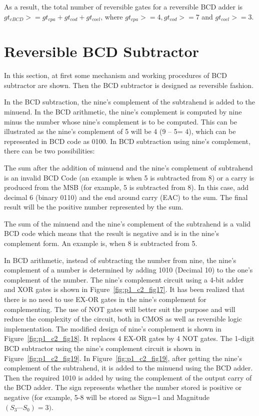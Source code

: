 As a result, the total number of reversible gates for a reversible BCD adder is $gt{}_{cBCD}{>} = gt{}_{cpa} + gt{}_{cod} + gt{}_{cocl}$, where $gt{}_{cpa}{>} = 4, gt{}_{cod}{>}= 7$ and $gt{}_{cocl}{>} = 3$.

\section{Reversible BCD Subtractor}
In this section, at first some mechanism and working procedures of BCD subtractor are shown. Then the BCD subtractor is designed as reversible fashion. %

In the BCD subtraction, the nine's complement of the subtrahend is added to the minuend. In the BCD arithmetic, the nine's complement is computed by nine minus the number whose nine's complement is to be computed. This can be illustrated as the nine's complement of 5 will be 4 (9 -- 5= 4), which can be represented in BCD code as 0100. In BCD subtraction using nine's complement, there can be two possibilities:

The sum after the addition of minuend and the nine's complement of subtrahend is an invalid BCD Code (an example is when 5 is subtracted from 8) or a carry is produced from the MSB (for example, 5 is subtracted from 8). In this case, add decimal 6 (binary 0110) and the end around carry (EAC) to the sum. The final result will be the positive number represented by the sum.

The sum of the minuend and the nine's complement of the subtrahend is a valid BCD code which means that the result is negative and is in the nine's complement form. An example is, when 8 is subtracted from 5.

In BCD arithmetic, instead of subtracting the number from nine, the nine's complement of a number is determined by adding 1010 (Decimal 10) to the one's complement of the number. The nine's complement circuit using a 4-bit adder and XOR gates is shown in Figure~\ref{fig:p1_c2_fig17}. It has been realized that there is no need to use EX-OR gates in the nine's complement for complementing. The use of NOT gates will better suit the purpose and will reduce the complexity of the circuit, both in CMOS as well as reversible logic implementation. The modified design of nine's complement is shown in Figure~\ref{fig:p1_c2_fig18}. It replaces 4 EX-OR gates by 4 NOT gates. The 1-digit BCD subtractor using the nine's complement circuit is shown in Figure~\ref{fig:p1_c2_fig19}. In Figure~\ref{fig:p1_c2_fig19}, after getting the nine's complement of the subtrahend, it is added to the minuend using the BCD adder. Then the required 1010 is added by using the complement of the output carry of the BCD adder. The sign represents whether the number stored is positive or negative (for example, 5-8 will be stored as Sign=1 and Magnitude $(S_3 \cdots S_0) = 3)$.

